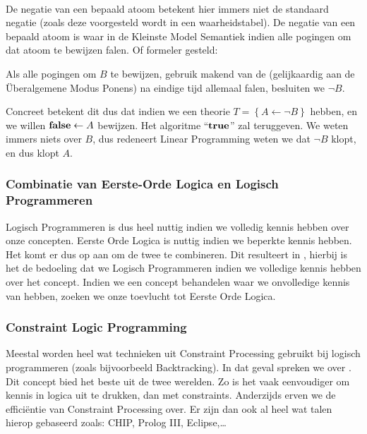 \paragraph{}
De negatie van een bepaald atoom betekent hier immers niet de standaard negatie (zoals deze voorgesteld wordt in een waarheidstabel). De negatie van een bepaald atoom is waar in de Kleinste Model Semantiek indien alle pogingen om dat atoom te bewijzen falen. Of formeler gesteld:
\begin{theorem}
Als alle pogingen om $B$ te bewijzen, gebruik makend van de  (gelijkaardig aan de Überalgemene Modus Ponens) na eindige tijd allemaal falen, besluiten we $\neg B$.
\end{theorem}
Concreet betekent dit dus dat indien we een theorie $T=\left\{A\leftarrow\neg B\right\}$ hebben, en we willen $\mbox{\bf false}\leftarrow A$ bewijzen. Het algoritme ``$\mbox{\bf true}$'' zal teruggeven. We weten immers niets over $B$, dus redeneert Linear Programming weten we dat $\neg B$ klopt, en dus klopt $A$.
\subsubsection{Combinatie van Eerste-Orde Logica en Logisch Programmeren}
Logisch Programmeren is dus heel nuttig indien we volledig kennis hebben over onze concepten. Eerste Orde Logica is nuttig indien we beperkte kennis hebben. Het komt er dus op aan om de twee te combineren. Dit resulteert in , hierbij is het de bedoeling dat we Logisch Programmeren indien we volledige kennis hebben over het concept. Indien we een concept behandelen waar we onvolledige kennis van hebben, zoeken we onze toevlucht tot Eerste Orde Logica.
\subsubsection{Constraint Logic Programming}
Meestal worden heel wat technieken uit Constraint Processing gebruikt bij logisch programmeren (zoals bijvoorbeeld Backtracking). In dat geval spreken we over . Dit concept bied het beste uit de twee werelden. Zo is het vaak eenvoudiger om kennis in logica uit te drukken, dan met constraints. Anderzijds erven we de efficiëntie van Constraint Processing over. Er zijn dan ook al heel wat talen hierop gebaseerd zoals: CHIP, Prolog III, Eclipse,\dots
